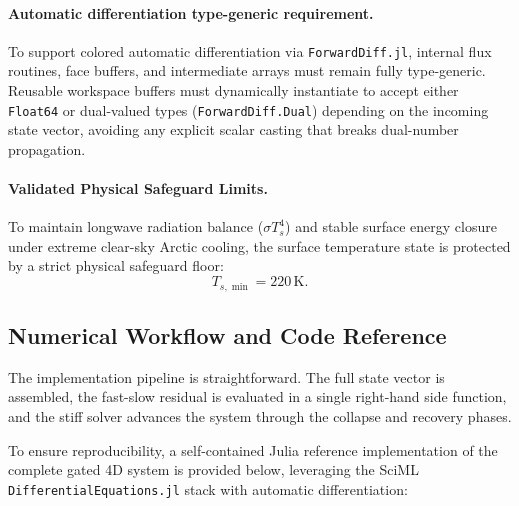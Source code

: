 \documentclass[11pt,letterpaper]{article}
\begin{document}
\paragraph{Automatic differentiation type-generic requirement.}
To support colored automatic differentiation via \texttt{ForwardDiff.jl}, internal flux routines, face buffers, and intermediate arrays must remain fully type-generic. Reusable workspace buffers must dynamically instantiate to accept either \texttt{Float64} or dual-valued types (\texttt{ForwardDiff.Dual}) depending on the incoming state vector, avoiding any explicit scalar casting that breaks dual-number propagation.

\paragraph{Validated Physical Safeguard Limits.}
To maintain longwave radiation balance ($\sigma T_s^4$) and stable surface energy closure under extreme clear-sky Arctic cooling, the surface temperature state is protected by a strict physical safeguard floor:
\begin{equation}
T_{s,\min} = 220\,\mathrm{K}.
\label{eq:ts_physical_floor}
\end{equation}

\subsection{Numerical Workflow and Code Reference}
\label{subsec:numerical_workflow}

The implementation pipeline is straightforward. The full state vector is assembled, the fast-slow residual is evaluated in a single right-hand side function, and the stiff solver advances the system through the collapse and recovery phases.

To ensure reproducibility, a self-contained Julia reference implementation of the complete gated 4D system is provided below, leveraging the SciML \texttt{DifferentialEquations.jl} stack with automatic differentiation:
\end{document}
